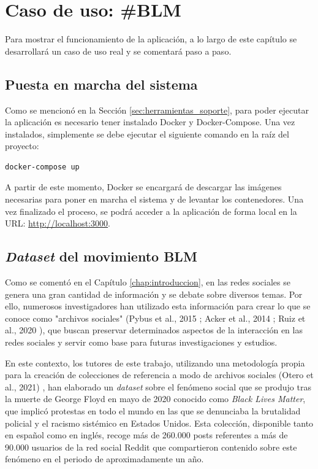 \chapter{Caso de uso: \#BLM}
\label{chap:casouso}

Para mostrar el funcionamiento de la aplicación, a lo largo de este capítulo se desarrollará un caso de uso real y se comentará paso a paso.

\section{Puesta en marcha del sistema}
\label{sec:casouso_puesta_en_marcha}

Como se mencionó en la Sección \ref{sec:herramientas_soporte}, para poder ejecutar la aplicación es necesario tener
instalado Docker y Docker-Compose. Una vez instalados, simplemente se debe ejecutar el siguiente comando en la raíz del
proyecto:

\bigskip
\begin{Verbatim}
docker-compose up
\end{Verbatim}

\bigskip
A partir de este momento, Docker se encargará de descargar las imágenes necesarias para poner en marcha el sistema y de levantar los
contenedores. Una vez finalizado el proceso, se podrá acceder a la aplicación de forma local en la URL: \url{http://localhost:3000}.

\section{\textit{Dataset} del movimiento BLM}
\label{sec:casouso_dataset}

Como se comentó en el Capítulo \ref{chap:introduccion}, en las redes sociales se genera una gran cantidad de información y se debate sobre
diversos temas. Por ello, numerosos investigadores han utilizado esta información para crear lo que se conoce como "archivos sociales"
(Pybus et al., 2015 \cite{pybus2015hacking}; Acker et al., 2014 \cite{acker2014death}; Ruiz et al., 2020 \cite{ruiz2020cuentalo}),
que buscan preservar determinados aspectos de la interacción en las redes sociales y servir como base para futuras investigaciones
y estudios.

\bigskip
En este contexto, los tutores de este trabajo, utilizando una metodología propia para la creación de colecciones de referencia
a modo de archivos sociales
(Otero et al., 2021) \cite{oterorodilla2021}, han elaborado un \textit{dataset} sobre el fenómeno social
que se produjo tras la muerte de George Floyd en mayo de 2020 conocido como \textit{Black Lives Matter},
que implicó protestas en todo el mundo en las que se denunciaba la brutalidad policial y el racismo sistémico en Estados Unidos. Esta colección, 
disponible tanto en español como en inglés, recoge más de 260.000 posts referentes a más de 90.000 usuarios de la red social Reddit que compartieron contenido sobre este
fenómeno en el periodo de aproximadamente un año.


